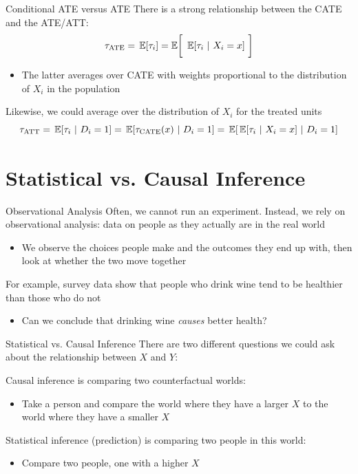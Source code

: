 \documentclass[aspectratio=169,t,11pt,table]{beamer}
\begin{document}
\begin{frame}{Conditional ATE versus ATE}
  There is a strong relationship between the CATE and the ATE/ATT:
  $$
    \tau_{\text{ATE}} = \expec{\tau_i} = \mathbb{E}\bigg[\  \expec{\tau_i}{X_i = x}\  \bigg]
  $$
  \begin{itemize}
    \item The latter averages over CATE with weights proportional to the distribution of $X_i$ in the population
  \end{itemize}


  \pause
  \bigskip
  Likewise, we could average over the distribution of $X_i$ for the treated units
  $$
    \tau_{\text{ATT}} = \expec{\tau_i}{D_i = 1} = \expec{\tau_{\text{CATE}}(x)}{D_i = 1} = \expec{\expec{\tau_i}{X_i = x}}{D_i = 1}
  $$
\end{frame}




\section{Statistical vs. Causal Inference}

\begin{frame}{Observational Analysis}
  Often, we cannot run an experiment. Instead, we rely on \alert{observational analysis}: data on people as they actually are in the real world
  \begin{itemize}
    \item We observe the choices people make and the outcomes they end up with, then look at whether the two move together
  \end{itemize}

  \pause
  \bigskip
  For example, survey data show that people who drink wine tend to be healthier than those who do not
  \begin{itemize}
    \item Can we conclude that drinking wine \emph{causes} better health?
  \end{itemize}
\end{frame}

\begin{frame}{Statistical vs. Causal Inference}
  There are two different questions we could ask about the relationship between $X$ and $Y$:

  \pause
  \bigskip
  \alert{Causal inference} is comparing two counterfactual worlds:
  \begin{itemize}
    \item Take a person and compare the world where they have a larger $X$ to the world where they have a smaller $X$
  \end{itemize}

  \pause
  \bigskip
  \alert{Statistical inference} (prediction) is comparing two people in this world:
  \begin{itemize}
    \item Compare two people, one with a higher $X$
  \end{itemize}
\end{frame}
\end{document}
